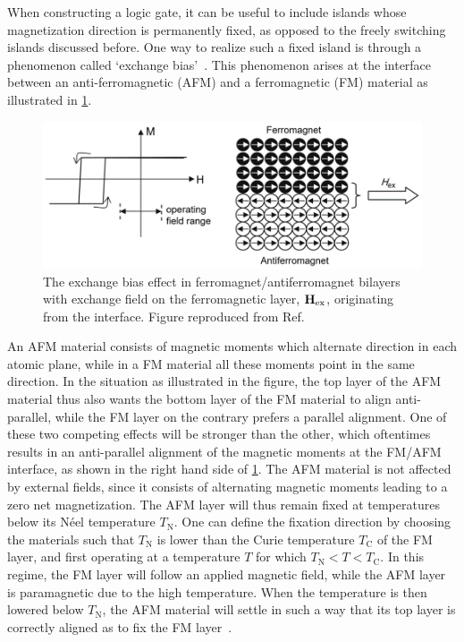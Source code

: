 \documentclass[11pt,a4paper,english,twoside]{article}
\begin{document}
When constructing a logic gate, it can be useful to include islands whose magnetization direction is permanently fixed, as opposed to the freely switching islands discussed before. One way to realize such a fixed island is through a phenomenon called `exchange bias'~\cite{ExchangeBias_Mechanisms,ExchangeBias_nanostructures,ExchangeBias,syllabus_PoAEaPD}. This phenomenon arises at the interface between an anti-ferromagnetic (AFM) and a ferromagnetic (FM) material as illustrated in \cref{fig:Intro_ExchangeBias}.
\begin{figure}[t]
    \centering
    \includegraphics[width=0.8\columnwidth]{Figures/Introduction/Syallabus_PoAEaPD - Figure 2.7.png}
    \caption{The exchange bias effect in ferromagnet/antiferromagnet bilayers with exchange field on the ferromagnetic layer, $\vb{H_\mathrm{ex}}$, originating from the interface. Figure reproduced from Ref.~\cite{syllabus_PoAEaPD,Syllabus_PoAEaPD_C2_Ref1}}
    \label{fig:Intro_ExchangeBias}
\end{figure}
An AFM material consists of magnetic moments which alternate direction in each atomic plane, while in a FM material all these moments point in the same direction. In the situation as illustrated in the figure, the top layer of the AFM material thus also wants the bottom layer of the FM material to align anti-parallel, while the FM layer on the contrary prefers a parallel alignment. One of these two competing effects will be stronger than the other, which oftentimes results in an anti-parallel alignment of the magnetic moments at the FM/AFM interface, as shown in the right hand side of \cref{fig:Intro_ExchangeBias}. The AFM material is not affected by external fields, since it consists of alternating magnetic moments leading to a zero net magnetization. The AFM layer will thus remain fixed at temperatures below its N\'{e}el temperature $T_\mathrm{N}$. One can define the fixation direction by choosing the materials such that $T_\mathrm{N}$ is lower than the Curie temperature $T_\mathrm{C}$ of the FM layer, and first operating at a temperature $T$ for which $T_\mathrm{N} < T < T_\mathrm{C}$. In this regime, the FM layer will follow an applied magnetic field, while the AFM layer is paramagnetic due to the high temperature. When the temperature is then lowered below $T_\mathrm{N}$, the AFM material will settle in such a way that its top layer is correctly aligned as to fix the FM layer~\cite{ExchangeBias_Mechanisms}. \par
\end{document}
